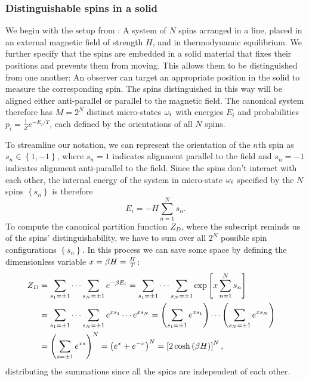 \subsubsection{\label{sec:spin_chain}Distinguishable spins in a solid}
We begin with the setup from : A system of $N$ spins arranged in a line, placed in an external magnetic field of strength $H$, and in thermodynamic equilibrium.
We further specify that the spins are embedded in a solid material that fixes their positions and prevents them from moving.
This allows them to be distinguished from one another: An observer can target an appropriate position in the solid to measure the corresponding spin.
The spins distinguished in this way will be aligned either anti-parallel or parallel to the magnetic field.
The canonical system therefore has $M = 2^N$ distinct micro-states $\omega_i$ with energies $E_i$ and probabilities $p_i = \frac{1}{Z} e^{-E_i / T}$, each defined by the orientations of all $N$ spins.

To streamline our notation, we can represent the orientation of the $n$th spin as $s_n \in \left\{1, -1\right\}$, where $s_n = 1$ indicates alignment parallel to the field and $s_n = -1$ indicates alignment anti-parallel to the field.
Since the spins don't interact with each other, the internal energy of the system in micro-state $\omega_i$ specified by the $N$ spins $\left\{s_n\right\}$ is therefore
\begin{equation}
  \label{eq:spin_energy}
  E_i = -H \sum_{n = 1}^N s_n.
\end{equation}
To compute the canonical partition function $Z_D$, where the subscript reminds us of the spins' distinguishability, we have to sum over all $2^N$ possible spin configurations $\left\{s_n\right\}$.
In this process we can save some space by defining the dimensionless variable $x = \beta H = \frac{H}{T}$:
\begin{align}
  Z_D & = \sum_{s_1 = \pm 1} \cdots \sum_{s_N = \pm 1} e^{-\beta E_i} = \sum_{s_1 = \pm 1} \cdots \sum_{s_N = \pm 1} \exp\left[x \sum_{n = 1}^N s_n\right] \cr
      & = \sum_{s_1 = \pm 1} \cdots \sum_{s_N = \pm 1} e^{x s_1} \cdots e^{x s_N} = \left(\sum_{s_1 = \pm 1} e^{x s_1}\right) \cdots \left(\sum_{s_N = \pm 1} e^{x s_N}\right) \cr
      & = \left(\sum_{s = \pm 1} e^{x s}\right)^N = \left(e^x + e^{-x}\right)^N = \left[2\cosh\left(\beta H\right)\right]^N, \label{eq:spin_part_func}
\end{align}
distributing the summations since all the spins are independent of each other.

